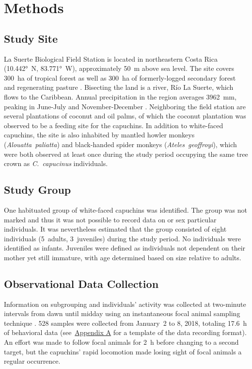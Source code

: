 \documentclass[american]{../../../coursework}
\begin{document}
\section{Methods}

\subsection{Study Site}

La Suerte Biological Field Station is located in northeastern Costa Rica
(10.442°~N, 83.771°~W), approximately \SI{50}{\metre} above sea level. The
site covers 300~ha of tropical forest as well as \SI{300}{\hectare} of
formerly-logged secondary forest and regenerating pasture
\parencite{Mallott2017}. Bisecting the land is a river, Río La Suerte, which
flows to the Caribbean. Annual precipitation in the region averages
\SI{3962}{\milli\metre}, peaking in June-July and November-December
\parencite{Sanford1994}. Neighboring the field station are several plantations
of coconut and oil palms, of which the coconut plantation was observed to be a
feeding site for the capuchins. In addition to white-faced capuchins, the site
is also inhabited by mantled howler monkeys (\emph{Alouatta~paliatta}) and
black-handed spider monkeys (\emph{Ateles~geoffroyi}), which were both
observed at least once during the study period occupying the same tree crown
as \emph{C.~capucinus} individuals.

\subsection{Study Group}

One habituated group of white-faced capuchins was identified. The group was
not marked and thus it was not possible to record data on or sex particular
individuals. It was nevertheless estimated that the group consisted of eight
individuals (5~adults, 3~juveniles) during the study period. No individuals
were identified as infants. Juveniles were defined as individuals not
dependent on their mother yet still immature, with age determined based on
size relative to adults.

\subsection{Observational Data Collection}

Information on subgrouping and individuals' activity was collected at
two-minute intervals from dawn until midday using an instantaneous focal
animal sampling technique \parencite{Altmann1974}. 528 samples were collected
from January~2 to 8, 2018, totaling \SI{17.6}{\hour} of behavioral data
(see~\hyperref[sec:appendix_a]{Appendix A} for a template of the data
recording format). An effort was made to follow focal animals for
\SI{2}{\hour} before changing to a second target, but the capuchins' rapid
locomotion made losing sight of focal animals a regular occurrence.
\end{document}
